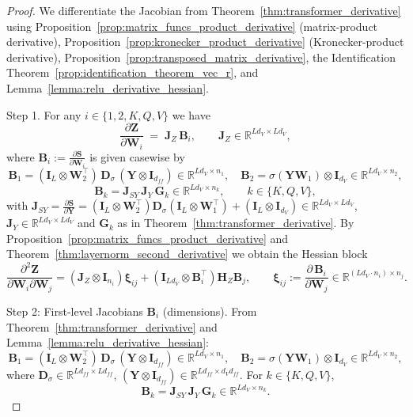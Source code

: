 \documentclass{article}
\begin{document}
\begin{proof}
We differentiate the Jacobian from Theorem~\ref{thm:transformer_derivative} using Proposition~\ref{prop:matrix_funcs_product_derivative} (matrix-product derivative), Proposition~\ref{prop:kronecker_product_derivative} (Kronecker-product derivative), Proposition~\ref{prop:transposed_matrix_derivative}, the Identification Theorem~\ref{prop:identification_theorem_vec_r}, and Lemma~\ref{lemma:relu_derivative_hessian}.

Step 1. For any $i \in \{1,2,K,Q,V\}$ we have
\[\frac{\partial \mathbf{Z}}{\partial \mathbf{W}_i} \;=\; \mathbf{J}_Z \, \mathbf{B}_i,\qquad\mathbf{J}_Z \in \mathbb{R}^{L d_V \times L d_V},\]
where $\mathbf{B}_i := \frac{\partial \mathbf{S}}{\partial \mathbf{W}_i}$ is given casewise by
\[\mathbf{B}_1 = (\mathbf{I}_L \otimes \mathbf{W}_2^\top)\, \mathbf{D}_\sigma\, (\mathbf{Y} \otimes \mathbf{I}_{d_{ff}}) \in \mathbb{R}^{L d_V \times n_1},\quad\mathbf{B}_2 = \sigma(\mathbf{Y}\mathbf{W}_1) \otimes \mathbf{I}_{d_V} \in \mathbb{R}^{L d_V \times n_2},\]
\[\mathbf{B}_k = \mathbf{J}_{SY}\, \mathbf{J}_Y\, \mathbf{G}_k \in \mathbb{R}^{L d_V \times n_k},\qquad k \in \{K,Q,V\},\]
with $\mathbf{J}_{SY} = \frac{\partial \mathbf{S}}{\partial \mathbf{Y}} = (\mathbf{I}_L \otimes \mathbf{W}_2^\top)\mathbf{D}_\sigma(\mathbf{I}_L \otimes \mathbf{W}_1^\top) + (\mathbf{I}_L \otimes \mathbf{I}_{d_V}) \in \mathbb{R}^{L d_V \times L d_V}$, $\mathbf{J}_Y \in \mathbb{R}^{L d_V \times L d_V}$ and $\mathbf{G}_k$ as in Theorem~\ref{thm:transformer_derivative}.
By Proposition~\ref{prop:matrix_funcs_product_derivative} and Theorem~\ref{thm:layernorm_second_derivative} we obtain the Hessian block
\[\frac{\partial^2 \mathbf{Z}}{\partial \mathbf{W}_i \partial \mathbf{W}_j}= \left( \mathbf{J}_Z \otimes \mathbf{I}_{n_i} \right) \boldsymbol{\xi}_{ij}  + \left( \mathbf{I}_{L d_V} \otimes \mathbf{B}_i^\top \right) \mathbf{H}_Z \mathbf{B}_j,\qquad\boldsymbol{\xi}_{ij} := \frac{\partial\, \mathbf{B}_i}{\partial \mathbf{W}_j} \in \mathbb{R}^{(L d_V \cdot n_i) \times n_j}.\]

Step 2: First-level Jacobians $\mathbf{B}_i$ (dimensions).
From Theorem~\ref{thm:transformer_derivative} and Lemma~\ref{lemma:relu_derivative_hessian}:
\[
\mathbf{B}_1 = (\mathbf{I}_L \otimes \mathbf{W}_2^\top)\, \mathbf{D}_\sigma\, (\mathbf{Y} \otimes \mathbf{I}_{d_{ff}}) \in \mathbb{R}^{L d_V \times n_1},
\quad
\mathbf{B}_2 = \sigma(\mathbf{Y}\mathbf{W}_1) \otimes \mathbf{I}_{d_V} \in \mathbb{R}^{L d_V \times n_2},
\]
where $\mathbf{D}_\sigma \in \mathbb{R}^{L d_{ff} \times L d_{ff}}$, $(\mathbf{Y} \otimes \mathbf{I}_{d_{ff}}) \in \mathbb{R}^{L d_{ff} \times d_V d_{ff}}$. For $k \in \{K,Q,V\}$,
\[\mathbf{B}_k = \mathbf{J}_{SY}\, \mathbf{J}_Y \, \mathbf{G}_k \in \mathbb{R}^{L d_V \times n_k}.\]


\end{proof}
\end{document}
